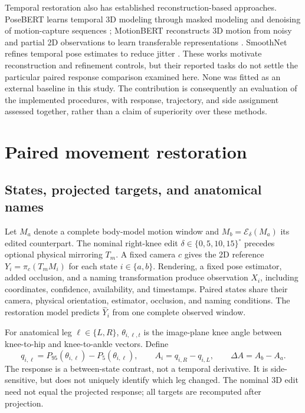 \documentclass{article}
\newcommand{\dg}{^{\circ}}
\begin{document}
Temporal restoration also has established reconstruction-based approaches. PoseBERT learns temporal 3D modeling through masked modeling and denoising of motion-capture sequences \citep{baradel2022posebert}; MotionBERT reconstructs 3D motion from noisy and partial 2D observations to learn transferable representations \citep{zhu2023motionbert}. SmoothNet refines temporal pose estimates to reduce jitter \citep{zeng2022smoothnet}. These works motivate reconstruction and refinement controls, but their reported tasks do not settle the particular paired response comparison examined here. None was fitted as an external baseline in this study. The contribution is consequently an evaluation of the implemented procedures, with response, trajectory, and side assignment assessed together, rather than a claim of superiority over these methods.

\section{Paired movement restoration}
\subsection{States, projected targets, and anatomical names}
Let $M_a$ denote a complete body-model motion window and $M_b=\mathcal E_\delta(M_a)$ its edited counterpart. The nominal right-knee edit $\delta\in\{0,5,10,15\}\dg$ precedes optional physical mirroring $T_m$. A fixed camera $c$ gives the 2D reference $Y_i=\pi_c(T_mM_i)$ for each state $i\in\{a,b\}$. Rendering, a fixed pose estimator, added occlusion, and a naming transformation produce observation $X_i$, including coordinates, confidence, availability, and timestamps. Paired states share their camera, physical orientation, estimator, occlusion, and naming conditions. The restoration model predicts $\widehat Y_i$ from one complete observed window.

For anatomical leg $\ell\in\{L,R\}$, $\theta_{i,\ell,t}$ is the image-plane knee angle between knee-to-hip and knee-to-ankle vectors. Define
\begin{equation}
q_{i,\ell}=P_{95}(\theta_{i,\ell})-P_5(\theta_{i,\ell}),\qquad
A_i=q_{i,R}-q_{i,L},\qquad \Delta A=A_b-A_a.
\label{eq:measurement}
\end{equation}
The response is a between-state contrast, not a temporal derivative. It is side-sensitive, but does not uniquely identify which leg changed. The nominal 3D edit need not equal the projected response; all targets are recomputed after projection.
\end{document}
